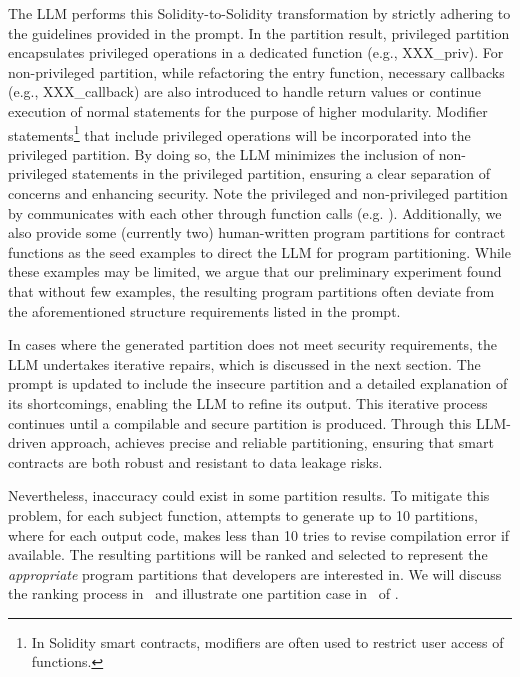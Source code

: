 The LLM performs this Solidity-to-Solidity transformation by strictly adhering to the guidelines provided in the prompt. 
In the partition result, privileged partition encapsulates privileged operations in a dedicated function (e.g., XXX\_priv).
For non-privileged partition, while refactoring the entry function, necessary callbacks (e.g., XXX\_callback) are also introduced to handle return values or continue execution of normal statements for the purpose of higher modularity. 
Modifier statements\footnote{In Solidity smart contracts, modifiers are often used to restrict user access of functions.} that include privileged operations will be incorporated into the privileged partition. 
By doing so, the LLM minimizes the inclusion of non-privileged statements in the privileged partition, ensuring a clear separation of concerns and enhancing security.
Note the privileged and non-privileged partition by \tool communicates with each other through function calls (e.g. ).
Additionally, we also provide some (currently two) human-written program partitions for contract functions as the seed examples to direct the LLM for program partitioning.
While these examples may be limited, we argue that our preliminary experiment found that without few examples, the resulting program partitions often deviate from the aforementioned structure requirements listed in the prompt.     

In cases where the generated partition does not meet security requirements, the LLM undertakes iterative repairs, which is discussed in the next section. The prompt is updated to include the insecure partition and a detailed explanation of its shortcomings, enabling the LLM to refine its output. This iterative process continues until a compilable and secure partition is produced. Through this LLM-driven approach, \tool achieves precise and reliable partitioning, ensuring that smart contracts are both robust and resistant to data leakage risks.

Nevertheless, inaccuracy could exist in some partition results. 
To mitigate this problem, for each subject function, \tool attempts to generate up to 10 partitions, where for each output code, \tool makes less than 10 tries to revise compilation error if available. 
The resulting partitions will be ranked and selected to represent the \emph{appropriate} program partitions that developers are interested in.
We will discuss the ranking process in~ and illustrate one partition case in~ of .    



